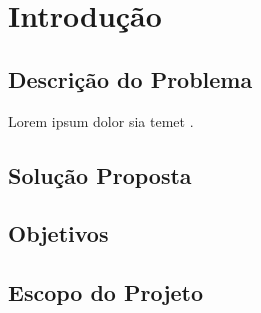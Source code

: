 \chapter{Introdução}

\section{Descrição do Problema}

Lorem ipsum dolor sia temet \cite[p. 3]{Kanan2015}.

\section{Solução Proposta}



\section{Objetivos}

\section{Escopo do Projeto}